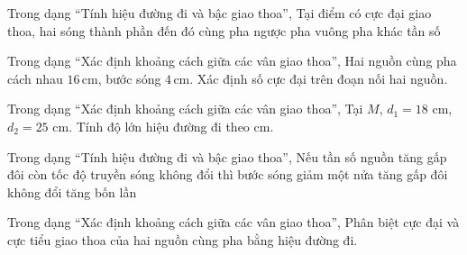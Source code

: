 \begin{ex}
Trong dạng “Tính hiệu đường đi và bậc giao thoa”, Tại điểm có cực đại giao thoa, hai sóng thành phần đến đó
\choice
{\True cùng pha}
{ngược pha}
{vuông pha}
{khác tần số}
\end{ex}

\begin{ex}
Trong dạng “Xác định khoảng cách giữa các vân giao thoa”, Hai nguồn cùng pha cách nhau $16\,\text{cm}$, bước sóng $4\,\text{cm}$. Xác định số cực đại trên đoạn nối hai nguồn.
\choiceTF

\end{ex}

\begin{ex}
Trong dạng “Xác định khoảng cách giữa các vân giao thoa”, Tại $M$, $d_1=18$ cm, $d_2=25$ cm. Tính độ lớn hiệu đường đi theo cm.
\end{ex}

\begin{ex}
Trong dạng “Tính hiệu đường đi và bậc giao thoa”, Nếu tần số nguồn tăng gấp đôi còn tốc độ truyền sóng không đổi thì bước sóng
\choice
{\True giảm một nửa}
{tăng gấp đôi}
{không đổi}
{tăng bốn lần}
\end{ex}

\begin{ex}
Trong dạng “Xác định khoảng cách giữa các vân giao thoa”, Phân biệt cực đại và cực tiểu giao thoa của hai nguồn cùng pha bằng hiệu đường đi.
\choiceTF

\end{ex}

